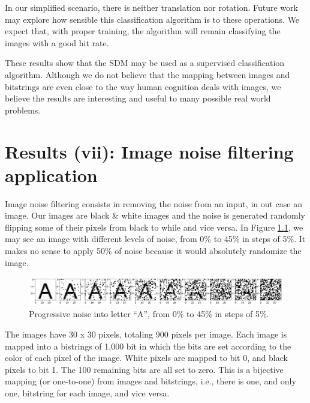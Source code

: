 In our simplified scenario, there is neither translation nor rotation. Future work may explore how sensible this classification algorithm is to these operations. We expect that, with proper training, the algorithm will remain classifying the images with a good hit rate.

These results show that the SDM may be used as a supervised classification algorithm. Although we do not believe that the mapping between images and bitstrings are even close to the way human cognition deals with images, we believe the results are interesting and useful to many possible real world problems.













\chapter{Results (vii): Image noise filtering application}

\lstset{
    language=Python,
    basicstyle=\small\ttfamily,
}

Image noise filtering consists in removing the noise from an input, in out case an image. Our images are black \& white images and the noise is generated randomly flipping some of their pixels from black to while and vice versa. In Figure \ref{fig-filter-progressive-noise}, we may see an image with different levels of noise, from 0\% to 45\% in steps of 5\%. It makes no sense to apply 50\% of noise because it would absolutely randomize the image.

\begin{figure}[!htb]
\centering\includegraphics[width=\textwidth]{./images02/filter/progressive-noise.png}
\caption{Progressive noise into letter ``A'', from 0\% to 45\% in steps of 5\%.
\label{fig-filter-progressive-noise}}
\end{figure}

The images have 30 x 30 pixels, totaling 900 pixels per image. Each image is mapped into a bistrings of 1,000 bit in which the bits are set according to the color of each pixel of the image. White pixels are mapped to bit 0, and black pixels to bit 1. The 100 remaining bits are all set to zero. This is a bijective mapping (or one-to-one) from images and bitstrings, i.e., there is one, and only one, bitstring for each image, and vice versa.

